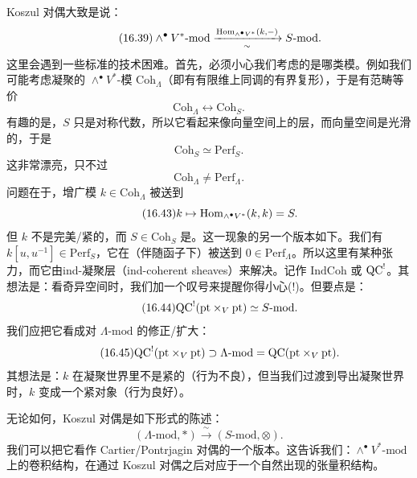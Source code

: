 Koszul 对偶大致是说：
\begin{equation}\tag{16.39}
\wedge^\bullet V^*\text{-}\mathrm{mod}\xrightarrow[\ \sim\ ]{\Hom_{\wedge^\bullet V^*}(k,-)}S\text{-}\mathrm{mod}.
\end{equation}
这里会遇到一些标准的技术困难。首先，必须小心我们考虑的是哪类模。例如我们可能考虑凝聚的 $\wedge^\bullet V^*$-模 $\mathrm{Coh}_\Lambda$（即有有限维上同调的有界复形），于是有范畴等价
\begin{equation}\tag{16.40}
\mathrm{Coh}_\Lambda\leftrightarrow\mathrm{Coh}_S.
\end{equation}
有趣的是，$S$ 只是对称代数，所以它看起来像向量空间上的层，而向量空间是光滑的，于是
\begin{equation}\tag{16.41}
\mathrm{Coh}_S\simeq\mathrm{Perf}_S.
\end{equation}
这非常漂亮，只不过
\begin{equation}\tag{16.42}
\mathrm{Coh}_\Lambda\neq\mathrm{Perf}_\Lambda.
\end{equation}
问题在于，增广模 $k\in\mathrm{Coh}_\Lambda$ 被送到
\begin{equation}\tag{16.43}
k\mapsto\mathrm{Hom}_{\wedge^\bullet V^*}(k,k)=S.
\end{equation}
但 $k$ 不是完美/紧的，而 $S\in\mathrm{Coh}_S$ 是。这一现象的另一个版本如下。我们有 $k[u,u^{-1}]\in\mathrm{Perf}_S$，它在（伴随函子下）被送到 $0\in\mathrm{Perf}_\Lambda$。所以这里有某种张力，而它由ind-凝聚层（ind-coherent sheaves）来解决。记作 $\mathrm{IndCoh}$ 或 $\mathrm{QC}^!$。其想法是：看奇异空间时，我们加一个叹号来提醒你得小心(!)。但要点是：
\begin{equation}\tag{16.44}
\mathrm{QC}^!(\mathrm{pt}\times_V\mathrm{pt})\simeq S\text{-}\mathrm{mod}.
\end{equation}
我们应把它看成对 $\Lambda\text{-}\mathrm{mod}$ 的修正/扩大：
\begin{equation}\tag{16.45}
\mathrm{QC}^!(\mathrm{pt}\times_V\mathrm{pt})\supset\Lambda\text{-}\mathrm{mod}=\mathrm{QC}(\mathrm{pt}\times_V\mathrm{pt}).
\end{equation}
其想法是：$k$ 在凝聚世界里不是紧的（行为不良），但当我们过渡到导出凝聚世界时，$k$ 变成一个紧对象（行为良好）。

无论如何，Koszul 对偶是如下形式的陈述：
\begin{equation}\tag{16.46}
(\Lambda\text{-}\mathrm{mod},*)\xrightarrow{\ \sim\ }(S\text{-}\mathrm{mod},\otimes).
\end{equation}
我们可以把它看作 Cartier/Pontrjagin 对偶的一个版本。这告诉我们：$\wedge^\bullet V^*\text{-}\mathrm{mod}$ 上的卷积结构，在通过 Koszul 对偶之后对应于一个自然出现的张量积结构。

